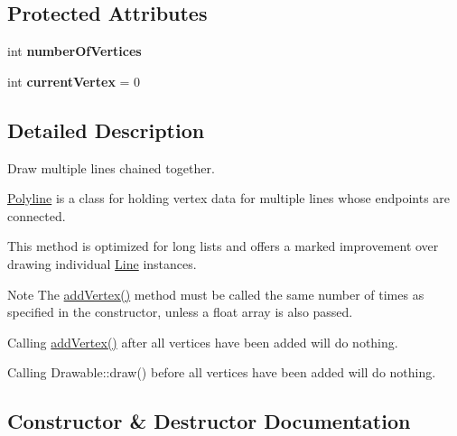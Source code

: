 \subsection*{Protected Attributes}
\begin{DoxyCompactItemize}
\item 
\mbox{\label{classtsgl_1_1_polyline_a52ffa27b4064471c53db8daee1f10f87}} 
int {\bfseries number\+Of\+Vertices}
\item 
\mbox{\label{classtsgl_1_1_polyline_a14d9d5bb616094bcf0504ac5b22069ad}} 
int {\bfseries current\+Vertex} = 0
\end{DoxyCompactItemize}


\subsection{Detailed Description}
Draw multiple lines chained together. 

\hyperlink{classtsgl_1_1_polyline}{Polyline} is a class for holding vertex data for multiple lines whose endpoints are connected.

This method is optimized for long lists and offers a marked improvement over drawing individual \hyperlink{classtsgl_1_1_line}{Line} instances. \begin{DoxyNote}{Note}
The \hyperlink{classtsgl_1_1_polyline_a938427299b0a5ecef0bbc4cf38d5ee1c}{add\+Vertex()} method must be called the same number of times as specified in the constructor, unless a float array is also passed. 

Calling \hyperlink{classtsgl_1_1_polyline_a938427299b0a5ecef0bbc4cf38d5ee1c}{add\+Vertex()} after all vertices have been added will do nothing. 

Calling Drawable\+::draw() before all vertices have been added will do nothing. 
\end{DoxyNote}


\subsection{Constructor \& Destructor Documentation}
\mbox{\label{classtsgl_1_1_polyline_a7c55401613659a0fcf207143acc70548}} 
